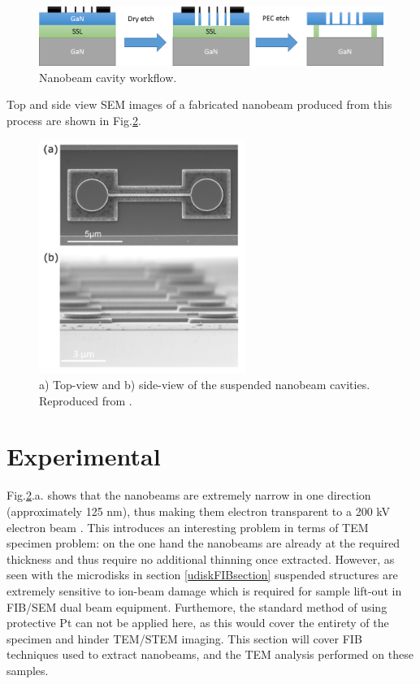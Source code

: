 \begin{figure}[h]
	\centering
	\includegraphics[width=1\textwidth]{Figs/Ch5/nanobeamfab.png}
	\caption {Nanobeam cavity workflow.}
	\label{nanobeamfab}
\end{figure}
\FloatBarrier 

Top and side view SEM images of a fabricated nanobeam produced from this process are shown in Fig.\ref{nb}.

\begin{figure}[h]
	\centering
	\includegraphics[width=0.6\textwidth]{Figs/Ch5/nb.png}
	\caption {a) Top-view and b) side-view of the suspended nanobeam cavities. Reproduced from \cite{Niu2015}.}
	\label{nb}
\end{figure}
\FloatBarrier 

\section{Experimental}

Fig.\ref{nb}.a. shows that the nanobeams are extremely narrow in one direction (approximately 125 nm), thus making them electron transparent to a 200 kV electron beam \cite{Rao2010}. This introduces an interesting problem in terms of TEM specimen problem: on the one hand the nanobeams are already at the required thickness and thus require no additional thinning once extracted. However, as seen with the microdisks in section \ref{udiskFIBsection} suspended structures are extremely sensitive to ion-beam damage which is required for sample lift-out in FIB/SEM dual beam equipment. Furthemore, the standard method of using protective Pt can not be applied here, as this would cover the entirety of the specimen and hinder TEM/STEM imaging. This section will cover FIB techniques used to extract nanobeams, and the TEM analysis performed on these samples.

